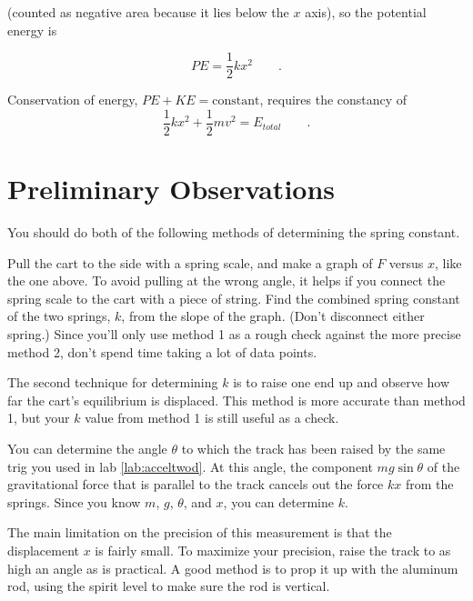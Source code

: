 (counted as negative area because it lies below the $x$
axis), so the potential energy is

\label{spring-constant}

\begin{equation*}
      PE  =   \frac{1}{2}kx^2  \qquad   .  
\end{equation*}

Conservation of energy, $PE+KE=\text{constant}$, requires the constancy of
\begin{equation*}
      \frac{1}{2}kx^2+\frac{1}{2}mv^2 = E_{total}  \qquad   .  
\end{equation*}

\section{Preliminary Observations}

You should do both of the following methods of determining
the spring constant.


Pull the cart to the side with a spring scale, and make
a graph of $F$ versus $x$, like the one above.
To avoid pulling at the wrong angle, it helps if you connect the spring scale
to the cart with a piece of string.
Find the combined spring constant of the two springs, $k$, from the slope of the graph. (Don't
disconnect either spring.) Since you'll only use method 1 as a rough check against the
more precise method 2, don't spend time taking a lot of data points.


The second technique for determining $k$ is to raise one end up
and observe how far the cart's equilibrium is displaced.
This method is more accurate than method 1, but your $k$ value from
method 1 is still useful as a check.

You can determine the angle $\theta$ to which the track has been raised by the same
trig you used in lab \ref{lab:acceltwod}. At this angle, the component $mg\sin\theta$
of the gravitational force that is parallel to the track cancels out the force
$kx$ from the springs. Since you know $m$, $g$, $\theta$, and $x$, you can determine
$k$.

The main limitation on the precision of this measurement is that the displacement $x$
is fairly small. To maximize your precision, raise the track to as high an angle as
is practical. A good method is to prop it up with the aluminum rod,
using the spirit level to make sure the rod is vertical.



